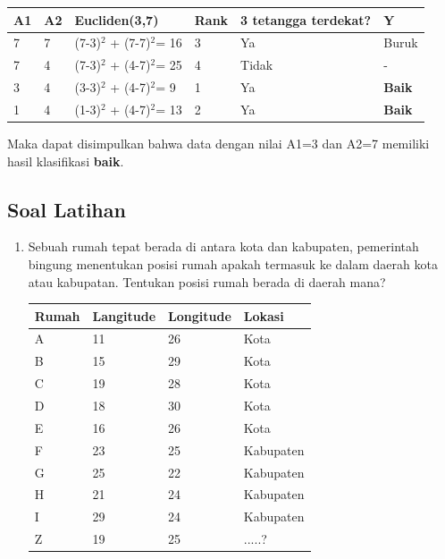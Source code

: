 \begin{enumerate}
\begin{table}[!ht]
    \label{knn3}
\begin{tabular}{|l|l|l|l|l|l|}
\hline
A1 & A2 & Eucliden(3,7)               & Rank & 3 tetangga terdekat? & Y             \\ \hline
7  & 7  & (7-3)$^{2}$ + (7-7)$^{2}$= 16 & 3    & Ya                   & Buruk         \\ \hline
7  & 4  & (7-3)$^{2}$ + (4-7)$^{2}$= 25 & 4    & Tidak                & -             \\ \hline
3  & 4  & (3-3)$^{2}$ + (4-7)$^{2}$= 9  & 1    & Ya                   & \textbf{Baik} \\ \hline
1  & 4  & (1-3)$^{2}$ + (4-7)$^{2}$= 13 & 2    & Ya                   & \textbf{Baik} \\ \hline
\end{tabular}
\end{table}
\end{enumerate}
Maka dapat disimpulkan bahwa data dengan nilai A1=3 dan A2=7 memiliki hasil klasifikasi \textbf{baik}.

\subsection{Soal Latihan}
\begin{enumerate}
    \item Sebuah rumah tepat berada di antara kota dan kabupaten, pemerintah bingung menentukan posisi rumah apakah termasuk ke dalam daerah kota atau kabupatan. Tentukan posisi rumah berada di daerah mana?
    \begin{table}[!htpb]
    \centering
\begin{tabular}{|l|l|l|l|}
\hline
Rumah & Langitude & Longitude & Lokasi    \\ \hline
A     & 11        & 26        & Kota      \\ \hline
B     & 15        & 29        & Kota      \\ \hline
C     & 19        & 28        & Kota      \\ \hline
D     & 18        & 30        & Kota      \\ \hline
E     & 16        & 26        & Kota      \\ \hline
F     & 23        & 25        & Kabupaten \\ \hline
G     & 25        & 22        & Kabupaten \\ \hline
H     & 21        & 24        & Kabupaten \\ \hline
I     & 29        & 24        & Kabupaten \\ \hline
Z     & 19        & 25        & .....?    \\ \hline
\end{tabular}
\end{table}
\end{enumerate}
\pagebreak
